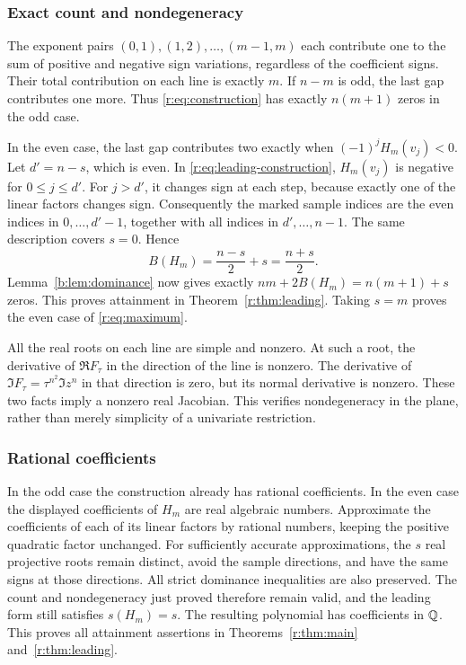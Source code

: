 \documentclass[UTF8,11pt]{ctexart}
\theoremstyle{definition}
\numberwithin{equation}{section}
\begin{document}
\subsubsection{Exact count and nondegeneracy}
The exponent pairs $(0,1),(1,2),\ldots,(m-1,m)$ each contribute one to
the sum of positive and negative sign variations, regardless of the
coefficient signs. Their total contribution on each line is exactly
$m$. If $n-m$ is odd, the last gap contributes one more. Thus
\eqref{r:eq:construction} has exactly $n(m+1)$ zeros in the odd case.

In the even case, the last gap contributes two exactly when
$(-1)^jH_m(v_j)<0$. Let $d'=n-s$, which is even. In
\eqref{r:eq:leading-construction}, $H_m(v_j)$ is negative for
$0\le j\le d'$. For $j>d'$, it changes sign at each step, because
exactly one of the linear factors changes sign. Consequently the
marked sample indices are the even indices in $0,\ldots,d'-1$,
together with all indices in $d',\ldots,n-1$. The same description
covers $s=0$. Hence
\[
 B(H_m)=\frac{n-s}{2}+s=\frac{n+s}{2}.
\]
Lemma~\ref{b:lem:dominance} now gives exactly $nm+2B(H_m)=n(m+1)+s$
zeros. This proves attainment in Theorem~\ref{r:thm:leading}. Taking
$s=m$ proves the even case of \eqref{r:eq:maximum}.

All the real roots on each line are simple and nonzero. At such a
root, the derivative of $\Re F_\tau$ in the direction of the line is
nonzero. The derivative of $\Im F_\tau=\tau^{n^2}\Im z^n$ in that
direction is zero, but its normal derivative is nonzero. These two
facts imply a nonzero real Jacobian. This verifies nondegeneracy in
the plane, rather than merely simplicity of a univariate restriction.

\subsubsection{Rational coefficients}
In the odd case the construction already has rational coefficients.
In the even case the displayed coefficients of $H_m$ are real
algebraic numbers. Approximate the coefficients of each of its linear
factors by rational numbers, keeping the positive quadratic factor
unchanged. For sufficiently accurate approximations, the $s$ real
projective roots remain distinct, avoid the sample directions, and
have the same signs at those directions. All strict dominance
inequalities are also preserved. The count and nondegeneracy just
proved therefore remain valid, and the leading form still satisfies
$s(H_m)=s$. The resulting polynomial has coefficients in $\mathbb Q$.
This proves all attainment assertions in Theorems~\ref{r:thm:main}
and~\ref{r:thm:leading}.
\end{document}

